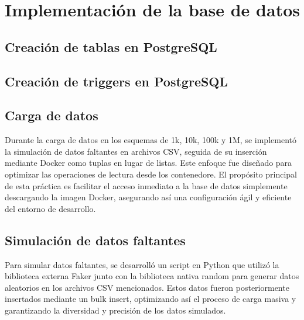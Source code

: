 \section{Implementación de la base de datos}
\subsection{Creación de tablas en PostgreSQL}

\subsection{Creación de triggers en PostgreSQL}

\subsection{Carga de datos}{Durante la carga de datos en los esquemas de 1k, 10k, 100k y 1M, se implementó la simulación de datos faltantes en archivos CSV, seguida de su inserción mediante Docker como tuplas en lugar de listas. Este enfoque fue diseñado para optimizar las operaciones de lectura desde los contenedore. El propósito principal de esta práctica es facilitar el acceso inmediato a la base de datos simplemente descargando la imagen Docker, asegurando así una configuración ágil y eficiente del entorno de desarrollo.}
\subsection{Simulación de datos faltantes}{Para simular datos faltantes, se desarrolló un script en Python que utilizó la biblioteca externa Faker junto con la biblioteca nativa random para generar datos aleatorios en los archivos CSV mencionados. Estos datos fueron posteriormente insertados mediante un bulk insert, optimizando así el proceso de carga masiva y garantizando la diversidad y precisión de los datos simulados.}